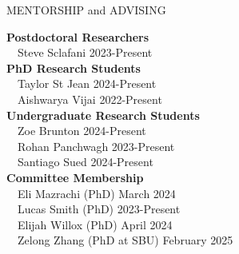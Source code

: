 \documentclass{resume} %
\begin{document}
\begin{rSection}{MENTORSHIP and ADVISING}

  \textbf{Postdoctoral Researchers} \\
  \-\ \-\ Steve Sclafani \hfill 2023-Present \\

  \textbf{PhD Research Students} \\
  \-\ \-\ Taylor St Jean \hfill 2024-Present \\
  \-\ \-\ Aishwarya Vijai \hfill 2022-Present \\

  \textbf{Undergraduate Research Students} \\
  \-\ \-\ Zoe Brunton \hfill 2024-Present \\
  \-\ \-\ Rohan Panchwagh \hfill 2023-Present \\
   \-\ \-\ Santiago Sued \hfill 2024-Present \\

  \textbf{Committee Membership} \\
  \-\ \-\ Eli Mazrachi (PhD) \hfill March 2024 \\
  \-\ \-\ Lucas Smith (PhD) \hfill 2023-Present \\
  \-\ \-\ Elijah Willox (PhD) \hfill April 2024 \\
  \-\ \-\ Zelong Zhang (PhD at SBU) \hfill February 2025 \\

\end{rSection}
\end{document}
